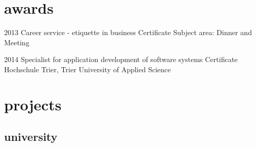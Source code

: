 \documentclass[]{friggeri-cv} %
\begin{document}
\newpage

\section{awards}

\begin{entrylist}


\entry
{2013}
{Career service - etiquette in business}
{Certificate}
{Subject area: Dinner and Meeting}


\entry
{2014}
{Specialist for application development of software systems}
{Certificate}
{Hochschule Trier, Trier University of Applied Science}
\\ 
\end{entrylist}


\section{projects}

\subsection{university}
\end{document}

